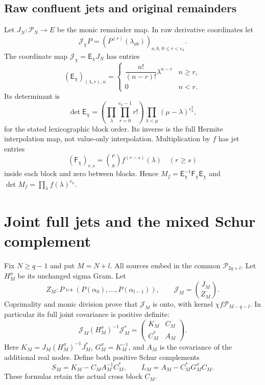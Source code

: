 \documentclass[11pt,a4paper]{article}
\newcommand{\C}{\mathbb C}
\begin{document}
\subsection{Raw confluent jets and original remainders}
Let $J_N:\mathcal P_N\to E$ be the monic remainder map. In raw derivative coordinates let
\begin{equation}
 \mathcal J_\chi P=(P^{(r)}(\lambda_{ab}))_{a,b,\,0\le r<e_k}.
\end{equation}
The coordinate map $\mathcal J_\chi=\mathsf E_\chi J_N$ has entries
\begin{equation}
 (\mathsf E_\chi)_{(\lambda,r),n}
 =\begin{cases}\dfrac{n!}{(n-r)!}\lambda^{n-r}&n\ge r,\\0&n<r.\end{cases}
\end{equation}
Its determinant is
\begin{equation}
 \det\mathsf E_\chi=
 \left(\prod_{\lambda}\prod_{r=0}^{e_k-1}r!\right)
 \prod_{\lambda<\mu}(\mu-\lambda)^{e_k^2},
\end{equation}
for the stated lexicographic block order. Its inverse is the full Hermite interpolation map, not value-only interpolation. Multiplication by $f$ has jet entries
\begin{equation}
 (\mathsf F_\chi)_{r,s}=\binom rs f^{(r-s)}(\lambda)\quad(r\ge s)
\end{equation}
inside each block and zero between blocks. Hence
$M_f=\mathsf E_\chi^{-1}\mathsf F_\chi\mathsf E_\chi$ and
$\det M_f=\prod_\lambda f(\lambda)^{e_k}$.

\section{Joint full jets and the mixed Schur complement}\label{sec:schur}
Fix $N\ge q-1$ and put $M=N+l$. All sources embed in the common $\mathcal P_{2q+l}$.
Let $H_M^\sigma$ be its unchanged sigma Gram. Let
\begin{equation}
 Z_M:P\longmapsto(P(\alpha_0),\ldots,P(\alpha_{l-1})),\qquad
 \mathscr J_M=\binom{J_M}{Z_M}.
\end{equation}
Coprimality and monic division prove that $\mathscr J_M$ is onto, with kernel
$\chi f\mathcal P_{M-q-l}$. In particular its full joint covariance is positive definite:
\begin{equation}
 \mathscr J_M(H_M^\sigma)^{-1}\mathscr J_M^*
 =\begin{pmatrix}K_M&C_M\\C_M^*&A_M\end{pmatrix}.
 \label{eq:joint}
\end{equation}
Here $K_M=J_M(H_M^\sigma)^{-1}J_M^*$, $G_M^\sigma=K_M^{-1}$, and $A_M$ is the covariance of the additional real nodes. Define both positive Schur complements
\begin{equation}
 S_M=K_M-C_MA_M^{-1}C_M^*,\qquad
 L_M=A_M-C_M^*G_M^\sigma C_M.
 \label{eq:schurs}
\end{equation}
These formulas retain the actual cross block $C_M$.
\end{document}
